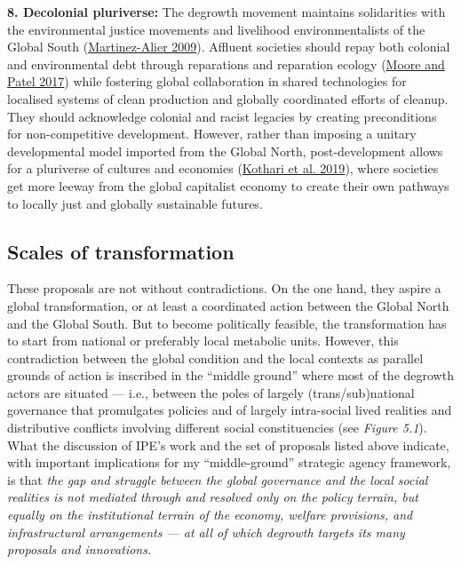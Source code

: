 \documentclass[a4paper, nobind]{templates/ociamthesis}
\begin{document}
\textbf{8. Decolonial pluriverse:} The degrowth movement maintains solidarities with the environmental justice movements and livelihood environmentalists of the Global South (\protect\hyperlink{ref-martinez-alier_socially_2009}{Martinez-Alier 2009}). Affluent societies should repay both colonial and environmental debt through reparations and reparation ecology (\protect\hyperlink{ref-moore_unearthing_2017}{Moore and Patel 2017}) while fostering global collaboration in shared technologies for localised systems of clean production and globally coordinated efforts of cleanup. They should acknowledge colonial and racist legacies by creating preconditions for non-competitive development. However, rather than imposing a unitary developmental model imported from the Global North, post-development allows for a pluriverse of cultures and economies (\protect\hyperlink{ref-kothari_pluriverse_2019}{Kothari et al. 2019}), where societies get more leeway from the global capitalist economy to create their own pathways to locally just and globally sustainable futures.

\hypertarget{scales-of-transformation}{%
\subsection{Scales of transformation}\label{scales-of-transformation}}

These proposals are not without contradictions. On the one hand, they aspire a global transformation, or at least a coordinated action between the Global North and the Global South. But to become politically feasible, the transformation has to start from national or preferably local metabolic units. However, this contradiction between the global condition and the local contexts as parallel grounds of action is inscribed in the ``middle ground'' where most of the degrowth actors are situated --- i.e., between the poles of largely (trans/sub)national governance that promulgates policies and of largely intra-social lived realities and distributive conflicts involving different social constituencies (see \emph{Figure 5.1}). What the discussion of IPE's work and the set of proposals listed above indicate, with important implications for my ``middle-ground'' strategic agency framework, is that \emph{the gap and struggle between the global governance and the local social realities is not mediated through and resolved only on the policy terrain, but equally on the institutional terrain of the economy, welfare provisions, and infrastructural arrangements --- at all of which degrowth targets its many proposals and innovations.}
\end{document}

